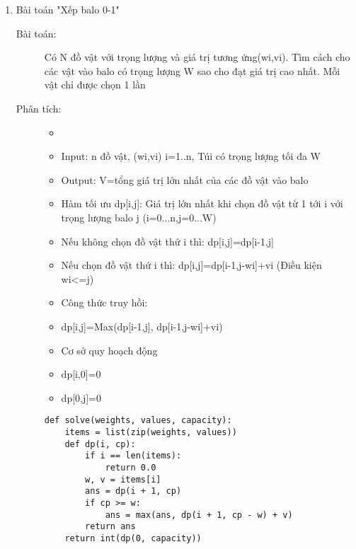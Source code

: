 \begin{enumerate}
    \item Bài toán "Xếp balo 0-1"
    \begin{description}
        \item[Bài toán:]Có N đồ vật với trọng lượng và giá trị tương ứng(wi,vi). Tìm cách cho các vật vào balo có trọng lượng W sao cho đạt giá trị cao
        nhất. Mỗi vật chỉ được chọn 1 lần
        \item[Phân tích:]
            \begin{itemize}
                \item[]
                \item Input: n đồ vật, (wi,vi) i=1..n, Túi có trọng lượng tối đa W
                \item Output: V=tổng giá trị lớn nhất của các đồ vật vào balo
                \item Hàm tối ưu dp[i,j]: Giá trị lớn nhất khi chọn đồ vật từ 1 tới i với trọng lượng balo j (i=0...n,j=0...W)
                \item[]Nếu không chọn đồ vật thứ i thì: dp[i,j]=dp[i-1,j]
                \item[]Nếu chọn đồ vật thứ i thì: dp[i,j]=dp[i-1,j-wi]+vi (Điều kiện wi<=j)
                \item Công thức truy hồi: 
                \item[]dp[i,j]=Max(dp[i-1,j], dp[i-1,j-wi]+vi)
                \item Cơ sở quy hoạch động
                \item[]dp[i,0]=0
                \item[]dp[0,j]=0
            \end{itemize}
        
        \begin{lstlisting}[style=algo]
def solve(weights, values, capacity):
    items = list(zip(weights, values))
    def dp(i, cp):
        if i == len(items):
            return 0.0
        w, v = items[i]
        ans = dp(i + 1, cp)
        if cp >= w:
            ans = max(ans, dp(i + 1, cp - w) + v)
        return ans
    return int(dp(0, capacity))
        \end{lstlisting}
    \end{description}
\end{enumerate}  
